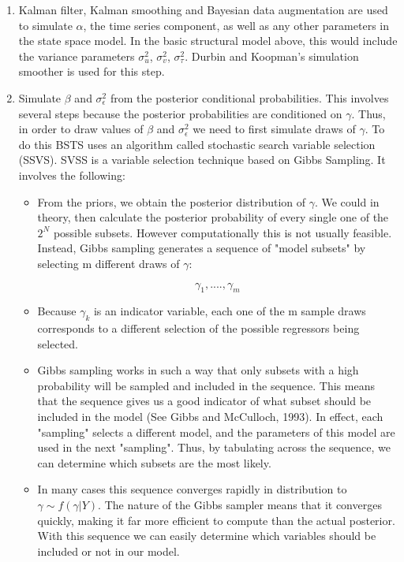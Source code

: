 \documentclass[11pt, oneside]{book}   	%
\begin{document}
\begin{enumerate}
\item Kalman filter, Kalman smoothing and Bayesian data augmentation are used to simulate $\alpha$, the time series component, as well as any other parameters in the state space model. In the basic structural model above, this would include the variance parameters $\sigma_{u}^{2}$, $\sigma_{v}^{2}$, $\sigma_{\tau}^{2}$.  Durbin and Koopman's simulation smoother is used for this step.

\item Simulate $\beta$ and $\sigma_{\epsilon}^{2}$ from the posterior conditional probabilities. This involves several steps because the posterior probabilities are conditioned on $\gamma$. Thus, in order to draw values of $\beta$ and $\sigma_{\epsilon}^{2}$ we need to first simulate draws of $\gamma$. To do this BSTS uses an algorithm called stochastic search variable selection (SSVS). SVSS is a variable selection technique based on Gibbs Sampling. It involves the following:

\begin {itemize}

\item From the priors, we obtain the posterior distribution of $\gamma$. We could in theory, then calculate the posterior probability of every single one of the $2^{N}$ possible subsets. However computationally this is not usually feasible. Instead, Gibbs sampling generates a sequence of "model subsets" by selecting m different draws of $\gamma$:

$$ \gamma_{1},....,\gamma_{m} $$

\item Because $\gamma_k$ is an indicator variable, each one of the m sample draws corresponds to a different selection of the possible regressors being selected. 

\item Gibbs sampling works in such a way that only subsets with a high probability will be sampled and included in the sequence. This means that the sequence gives us a good indicator of what subset should be included in the model (See Gibbs and McCulloch, 1993). In effect, each "sampling" selects a different model, and the parameters of this model are used in the next "sampling". Thus, by tabulating across the sequence, we can determine which subsets are the most likely.


\item In many cases this sequence converges rapidly in distribution to $\gamma \sim f(\gamma | Y)$. The nature of the Gibbs sampler means that it converges quickly, making it far more efficient to compute than the actual posterior. With this sequence we can easily determine which variables should be included or not in our model. 

\end {itemize}

\end {enumerate}
\end{document}
